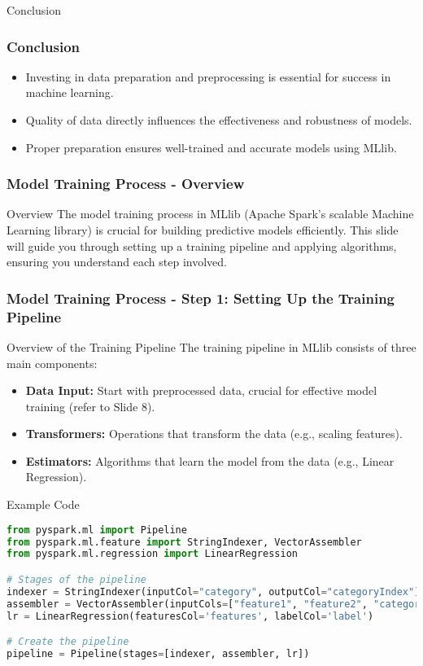 \documentclass[aspectratio=169]{beamer}
\begin{document}
\begin{frame}[fragile]{Conclusion}
    \frametitle{Conclusion}
    \begin{itemize}
        \item Investing in data preparation and preprocessing is essential for success in machine learning.
        \item Quality of data directly influences the effectiveness and robustness of models.
        \item Proper preparation ensures well-trained and accurate models using MLlib.
    \end{itemize}
\end{frame}

\begin{frame}
    \frametitle{Model Training Process - Overview}
    \begin{block}{Overview}
        The model training process in MLlib (Apache Spark's scalable Machine Learning library) is crucial for building predictive models efficiently. This slide will guide you through setting up a training pipeline and applying algorithms, ensuring you understand each step involved.
    \end{block}
\end{frame}

\begin{frame}[fragile]
    \frametitle{Model Training Process - Step 1: Setting Up the Training Pipeline}
    \begin{block}{Overview of the Training Pipeline}
        The training pipeline in MLlib consists of three main components:
    \end{block}
    \begin{itemize}
        \item \textbf{Data Input:} Start with preprocessed data, crucial for effective model training (refer to Slide 8).
        \item \textbf{Transformers:} Operations that transform the data (e.g., scaling features).
        \item \textbf{Estimators:} Algorithms that learn the model from the data (e.g., Linear Regression).
    \end{itemize}
    \begin{block}{Example Code}
        \begin{lstlisting}[language=Python]
from pyspark.ml import Pipeline
from pyspark.ml.feature import StringIndexer, VectorAssembler
from pyspark.ml.regression import LinearRegression

# Stages of the pipeline
indexer = StringIndexer(inputCol="category", outputCol="categoryIndex")
assembler = VectorAssembler(inputCols=["feature1", "feature2", "categoryIndex"], outputCol="features")
lr = LinearRegression(featuresCol='features', labelCol='label')

# Create the pipeline
pipeline = Pipeline(stages=[indexer, assembler, lr])
        \end{lstlisting}
    \end{block}
\end{frame}
\end{document}
